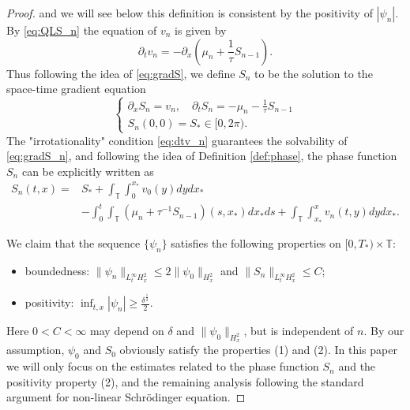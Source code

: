 \documentclass[leqno]{amsart}
\theoremstyle{plain}
\theoremstyle{definition}
\theoremstyle{remark}
\theoremstyle{plain}
\theoremstyle{plain}
\def\T{{\mathbb T}}%
\def\d{{\partial}}
\numberwithin{equation}{section}
\begin{document}
\begin{proof}
and we will see below this definition is consistent by the positivity of $|\psi_n|$. By \eqref{eq:QLS_n} the equation of $v_n$ is given by
\begin{equation}\label{eq:dtv_n}
\d_t v_n=-\d_x\left(\mu_n+\frac{1}{\tau}S_{n-1}\right).
\end{equation}
Thus following the idea of \eqref{eq:gradS}, we define $S_n$ to be the solution to the space-time gradient equation 
\begin{equation}\label{eq:gradS_n}
\begin{cases}
\d_xS_n =v_n,\quad\d_t S_n=-\mu_n-\frac{1}{\tau}S_{n-1} \\
S_n(0,0)=S_*\in [0,2\pi).
\end{cases}
\end{equation}
The "irrotationality" condition \eqref{eq:dtv_n} guarantees the solvability of \eqref{eq:gradS_n}, and following the idea of Definition \ref{def:phase}, the phase function $S_n$ can be explicitly written as
\begin{equation}\label{eq:defS_n}
\begin{aligned}
S_n(t,x)=&S_*+\int_\T\int_0^{x_*}v_0(y)dydx_*\\
&-\int_0^t \int_\T(\mu_n+\tau^{-1}S_{n-1})(s,x_*)dx_*ds+\int_\T\int_{x_*}^x v_n(t,y)dydx_*.
\end{aligned}
\end{equation}

We claim that the sequence $\{\psi_n\}$ satisfies the following properties on $[0,T_*)\times \T$:
\begin{itemize}
\item[(1)] boundedness: $\|\psi_n\|_{L^\infty_tH^2_x}\leq 2\|\psi_0\|_{H^2_x}$ and $\|S_{n}\|_{L^\infty_tH^2_x}\leq C$;
\item[(2)] positivity: $\inf_{t,x}|\psi_n|\geq \frac{\delta^\frac12}{2}$.
\end{itemize}
Here $0<C<\infty$ may depend on $\delta$ and $\|\psi_0\|_{H^2_x}$, but is independent of $n$. By our assumption, $\psi_0$ and $S_0$ obviously satisfy the properties (1) and (2). In this paper we will only focus on the estimates related to the phase function $S_n$ and the positivity property (2), and the remaining analysis following the standard argument for non-linear Schr\"odinger equation.


\end{proof}
\end{document}
